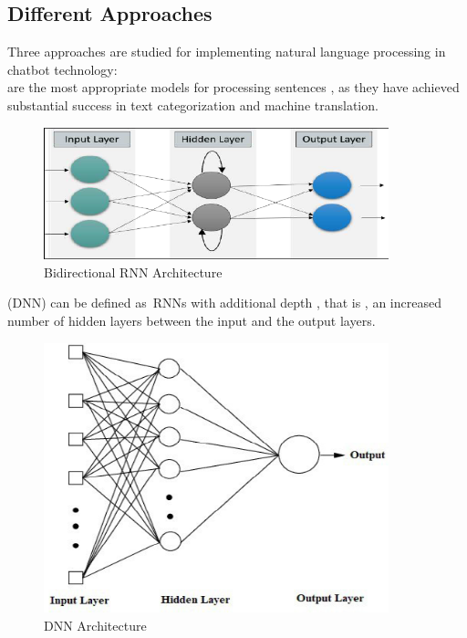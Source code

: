 \documentclass[12pt,a4paper]{report}     %
\begin{document}
\begin{normalsize}
{{\section{Different Approaches }
{\setlength{\baselineskip}{1.1\baselineskip}
Three approaches are studied for implementing natural language processing in chatbot technology:\\
\- are the most appropriate models for processing sentences , as they have achieved substantial success in text categorization and machine translation.\\
\begin{figure}[htp]
    \centering
    \includegraphics[width=10cm]{brnn.png}
    \caption{Bidirectional RNN Architecture}
    \label{fig:architetcture}
\end{figure} 
\- (DNN) can be defined as RNNs with additional depth , that is , an increased number of hidden layers between the input and the output layers.\\
\begin{figure}[htp]
    \centering
    \includegraphics[width=10cm]{dnn.png}
    \caption{DNN Architecture}
    \label{fig:architetcture}
\end{figure}
}}}
\end{normalsize}
\end{document}
